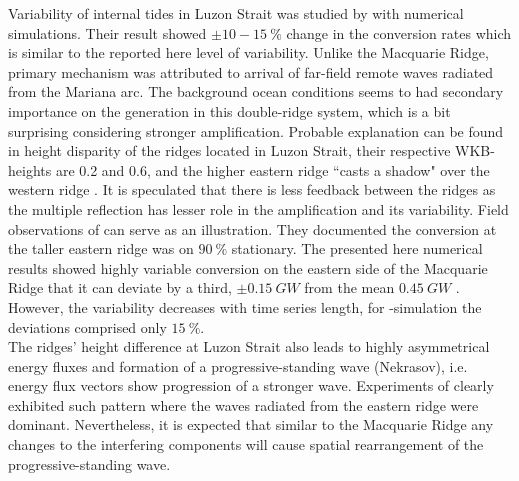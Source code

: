 \documentclass[12pt]{article}
\begin{document}
Variability of internal tides in Luzon Strait was studied by \cite{kerry2014impact} with numerical 
simulations. Their result showed $\pm 10-15~\%$ change in the conversion rates which is similar 
to the reported here level of variability. Unlike the Macquarie Ridge, primary mechanism was 
attributed to arrival of far-field remote waves radiated from the Mariana arc. The background ocean 
conditions seems to had secondary importance on the generation in this double-ridge system, which 
is a bit surprising considering stronger amplification. Probable explanation can be found in 
height disparity of the ridges located in Luzon Strait, their respective WKB-heights are 0.2 and 
0.6, and the higher eastern ridge ``casts a shadow" over the western ridge 
\citep{klymak2013parameterizing}. It is speculated that there is less feedback between the ridges 
as the multiple reflection has lesser role in the amplification and its variability. Field 
observations of 
\cite{pickering2015structure} can serve as an illustration. They documented the  
conversion at the taller eastern ridge was on $90~\%$ stationary. The presented here numerical 
results showed highly variable conversion on the eastern side of the Macquarie Ridge that it can 
deviate by a third, $\pm 0.15~GW$ from the mean $0.45~GW$ . However, 
the variability decreases with time series length, for -simulation the deviations 
comprised only $15~\%$.\\

The ridges' height difference at Luzon Strait also leads to highly asymmetrical energy fluxes and 
formation of a progressive-standing wave (Nekrasov), i.e. energy flux vectors show progression of a 
stronger wave. Experiments of \citep{buijsman2014three} clearly exhibited such pattern where the 
waves radiated from the eastern ridge were dominant. Nevertheless, it is expected that similar to 
the Macquarie Ridge any changes to the interfering components will cause spatial rearrangement of 
the progressive-standing wave.
\end{document}
